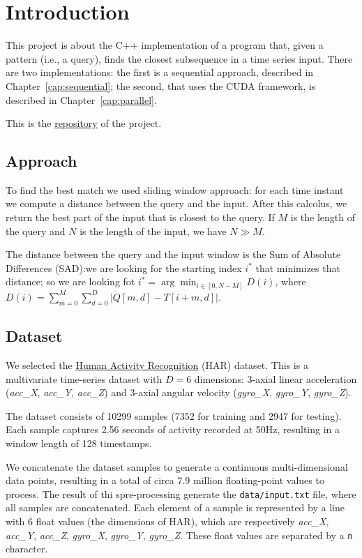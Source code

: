 \chapter{Introduction}
This project is about the C++ implementation of a program that, given a pattern (i.e., a query), finds the closest subsequence in a time series input. There are two implementations: the first is a sequential approach, described in Chapter~\ref{cap:sequential}; the second, that uses the CUDA framework, is described in Chapter~\ref{cap:parallel}.

This is the \href{https://github.com/edoardosarri24/time-series-pattern-recognition}{repository} of the project.

\section{Approach}
\label{sec:distance}
To find the best match we used sliding window approach: for each time instant we compute a distance between the query and the input. After this calcolus, we return the best part of the input that is closest to the query. If $M$ is the length of the query and $N$ is the length of the input, we have $N\gg M$.

The distance between the query and the input window is the Sum of Absolute Differences (SAD):we are looking for the starting index $i^*$ that minimizes that distance; so we are looking fot $\displaystyle i^*=\arg\min_{i\in[0,N-M]}D(i)$, where $\displaystyle D(i)=\sum_{m=0}^{M} \sum_{d=0}^{D} |Q[m,d] - T[i+m,d]|$.

\section{Dataset}
\label{sec:dataset}
We selected the \href{https://archive.ics.uci.edu/dataset/240/human+activity+recognition+using+smartphones}{Human Activity Recognition} (HAR) dataset. This is a multivariate time-series dataset with $D=6$ dimensions: 3-axial linear acceleration (\textit{acc\_X}, \textit{acc\_Y}, \textit{acc\_Z}) and 3-axial angular velocity (\textit{gyro\_X}, \textit{gyro\_Y}, \textit{gyro\_Z}).

The dataset consists of 10299 samples (7352 for training and 2947 for testing). Each sample captures 2.56 seconds of activity recorded at 50Hz, resulting in a window length of 128 timestamps.

We concatenate the dataset samples to generate a continuous multi-dimensional data points, resulting in a total of circa 7.9 million floating-point values to process. The result of thi spre-processing generate the \texttt{data/input.txt} file, where all samples are concatenated. Each element of a sample is represented by a line with 6 float values (the dimensions of HAR), which are respectively \textit{acc\_X}, \textit{acc\_Y}, \textit{acc\_Z}, \textit{gyro\_X}, \textit{gyro\_Y}, \textit{gyro\_Z}. These float values are separated by a \texttt{n} character.

